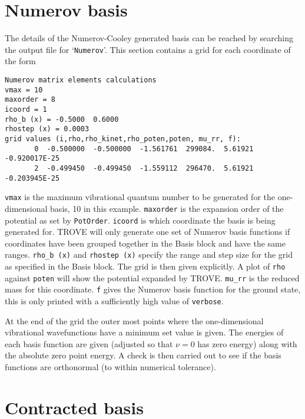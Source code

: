 \section{Numerov basis}
The details of the Numerov-Cooley generated basis can be reached by searching the output file for `\verb|Numerov|'. This section contains a grid for each coordinate of the form
\begin{verbatim}
Numerov matrix elements calculations
vmax = 10
maxorder = 8
icoord = 1
rho_b (x) = -0.5000  0.6000
rhostep (x) = 0.0003
grid values (i,rho,rho_kinet,rho_poten,poten, mu_rr, f):
       0  -0.500000  -0.500000  -1.561761  299084.  5.61921  -0.920017E-25
       2  -0.499450  -0.499450  -1.559112  296470.  5.61921  -0.203945E-25
\end{verbatim}
\verb|vmax| is the maximum vibrational quantum number to be generated for the one-dimensional basis, 10 in this example.
 \verb|maxorder| is the expansion order of the potential
as set by \verb|PotOrder|. \verb|icoord| is which coordinate the basis is being generated for. TROVE will only generate
one set of Numerov basis functions if coordinates have been grouped together in the Basis block and have the same 
ranges. \verb|rho_b (x)| 
and \verb|rhostep (x)| specify the range and step size for the grid as specified in the Basis block. 
The grid is then given explicitly. A plot of \verb|rho| against \verb|poten| will show the potential expanded by TROVE.
\verb|mu_rr| is the reduced mass for this coordinate. \verb|f| gives the Numerov basis function for the ground state,
this is only printed with a sufficiently high value of \verb|verbose|. 

At the end of the grid the outer most points where the one-dimensional vibrational wavefunctions have a minimum set
value is given. The energies of each basis function are given (adjusted so that $\nu = 0$ has zero energy) along with the 
absolute zero point energy.
A check is then carried out to see if the basis functions are orthonormal (to within numerical tolerance).

\section{Contracted basis}

